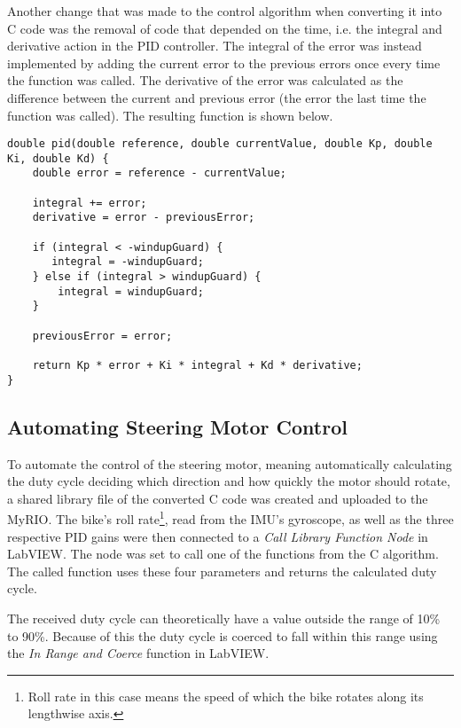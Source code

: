 Another change that was made to the control algorithm when converting it into C code was the removal of code that depended on the time, i.e. the integral and derivative action in the PID controller. The integral of the error was instead implemented by adding the current error to the previous errors once every time the function was called. The derivative of the error was calculated as the difference between the current and previous error (the error the last time the function was called). The resulting function is shown below.

\begin{lstlisting}
double pid(double reference, double currentValue, double Kp, double Ki, double Kd) {
    double error = reference - currentValue;

    integral += error;
    derivative = error - previousError;

    if (integral < -windupGuard) {
       integral = -windupGuard;
    } else if (integral > windupGuard) {
        integral = windupGuard;
    }

    previousError = error;

    return Kp * error + Ki * integral + Kd * derivative;
}
\end{lstlisting}

\subsection{Automating Steering Motor Control}

To automate the control of the steering motor, meaning automatically calculating the duty cycle deciding which direction and how quickly the motor should rotate, a shared library file of the converted C code was created and uploaded to the MyRIO. The bike's roll rate\footnote{Roll rate in this case means the speed of which the bike rotates along its lengthwise axis.}, read from the IMU's gyroscope, as well as the three respective PID gains were then connected to a \textit{Call Library Function Node} in LabVIEW. The node was set to call one of the functions from the C algorithm. The called function uses these four parameters and returns the calculated duty cycle.

The received duty cycle can theoretically have a value outside the range of 10\% to 90\%. Because of this the duty cycle is coerced to fall within this range using the \textit{In Range and Coerce} function in LabVIEW.

